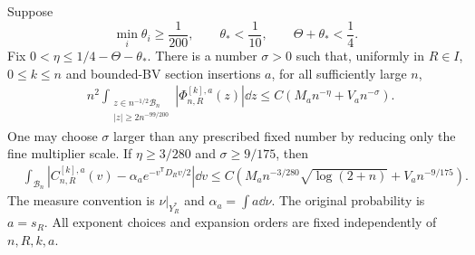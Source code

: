 \begin{theorem}
\label{thm:anisotropic-fixed-count-band}
Suppose
\begin{equation}\label{eq:anisotropic-feasible-region}
 \min_i\theta_i\ge\frac1{200},\qquad
 \theta_*<\frac1{10},\qquad
 \Theta+\theta_*<\frac14.
\end{equation}
Fix $0<\eta\le1/4-\Theta-\theta_*$. There is a number $\sigma>0$
such that, uniformly in $R\in I$, $0\le k\le n$ and bounded-BV
section insertions $a$, for all sufficiently large $n$,
\begin{align}
 &n^2\int_{\substack{z\in n^{-1/2}\mathcal B_n\\
                         |z|\ge2n^{-99/200}}}
             |\Phi^{[k],a}_{n,R}(z)|\dd z
       \le C\left(M_an^{-\eta}+V_an^{-\sigma}\right).
 \label{eq:anisotropic-fixed-count-band}
\end{align}
One may choose $\sigma$ larger than any prescribed fixed number by
reducing only the fine multiplier scale. If
$\eta\ge3/280$ and $\sigma\ge9/175$, then
\begin{align}
 &\int_{\mathcal B_n}
 |C^{[k],a}_{n,R}(v)-\alpha_a e^{-v^{\mathsf T}D_Rv/2}|\dd v
 \le C\left(M_an^{-3/280}\sqrt{\log(2+n)}+V_an^{-9/175}\right).
 \label{eq:anisotropic-central-band}
\end{align}
The measure convention is $\nu|_{Y_R^*}$ and
$\alpha_a=\int a\dd\nu$. The original probability is $a=s_R$.
All exponent choices and expansion orders are fixed independently of
$n,R,k,a$.
\end{theorem}

